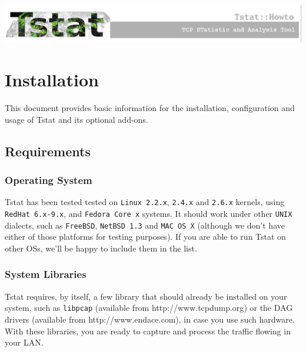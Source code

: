 \documentclass[11pt]{article}
\begin{document}
    \begin{center}
        \includegraphics[width=\textwidth]{tstat_banner.eps}
    \end{center}
    \tableofcontents
    


\clearpage

       \selectfont


\section{Installation\label{Installation}}


This document provides basic information
for the installation, configuration and usage 
of Tstat and its optional add-ons.

\subsection{Requirements\label{Requirements}}
\subsubsection{Operating System\label{Operating_System}}


Tstat has been tested tested on \texttt{Linux 2.2.x}, \texttt{2.4.x} and \texttt{2.6.x} kernels, 
using \texttt{RedHat 6.x-9.x}, and \texttt{Fedora Core x} systems. 
It should work under other \texttt{UNIX} dialects, such as 
\texttt{FreeBSD}, \texttt{NetBSD 1.3} and \texttt{MAC OS X} (although we don't have either of 
those platforms for testing purposes). If you are able to run Tstat on 
other OSs, we'll be happy to include them in the list.

\subsubsection{System Libraries\label{System_Libraries}}


Tstat requires, by itself, a few library that should
already be installed on your system, such as 
\texttt{libpcap} (available from \textsf{http://www.tcpdump.org}) 
or the DAG drivers (available from \textsf{http://www.endace.com}), 
in case you use such hardware. With these libraries, 
you are ready to capture and process the traffic flowing
in your LAN.
\end{document}
